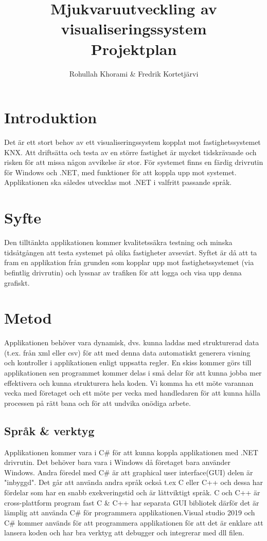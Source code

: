 \documentclass{article}
\title{Mjukvaruutveckling av visualiseringssystem\\
\Large {Projektplan}
}
\author{Rohullah Khorami \& Fredrik Kortetjärvi }
\begin{document}
\maketitle
\newpage
\tableofcontents
\newpage

\section{Introduktion}Det är ett stort behov av ett visualiseringssystem kopplat mot fastighetssystemet KNX. Att driftsätta och testa av
en större fastighet är mycket tidskrävande och risken för att missa någon avvikelse är stor. 
För systemet finns en färdig drivrutin för Windows och .NET, med funktioner för att koppla upp mot systemet.
Applikationen ska således utvecklas mot .NET i valfritt passande språk.

\section{Syfte}Den tilltänkta applikationen kommer kvalitetssäkra testning och minska tidsåtgången att testa systemet på olika fastigheter avsevärt. Syftet är då att ta fram en applikation från grunden som kopplar upp mot
fastighetssystemet (via befintlig drivrutin) och lyssnar av trafiken för att logga och visa upp denna grafiskt.

\section{Metod}
Applikationen behöver vara dynamisk, dvs. kunna laddas med strukturerad data (t.ex. från xml eller csv) för att
med denna data automatiskt generera visning och kontroller i applikationen enligt uppsatta regler. En skiss kommer görs till applikationen sen programmet kommer delas i små delar för att kunna jobba mer effektivera och kunna strukturera hela koden. Vi komma ha ett möte varannan vecka med företaget och ett möte per vecka med handledaren för att kunna hålla processen på rätt bana och för att undvika onödiga arbete. \newline
\subsection{Språk \& verktyg}
Applikationen kommer vara i C\# för att kunna koppla applikationen med .NET drivrutin. Det behöver bara vara i Windows då företaget bara använder Windows. Andra föredel med C\# är att graphical user interface(GUI) delen är "inbyggd". Det går att använda andra språk också t.ex C eller C++ och dessa har fördelar som har en snabb exekveringstid och är lättviktigt språk. C och C++ är cross-plattform program fast C \& C++ har separata GUI bibliotek därför det är lämplig att använda C\# för programmera applikationen.Visual studio 2019 och C\# kommer används för att programmera applikationen för att det är enklare att lansera koden och har bra verktyg att debugger och integrerar med dll filen.\newline 
\end{document}

